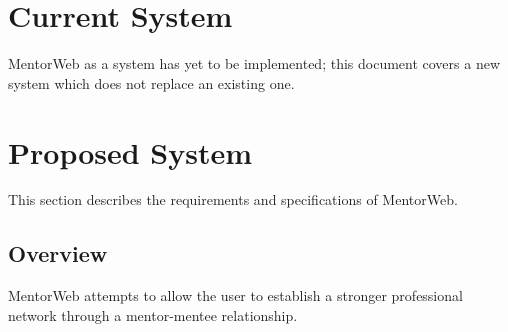 \documentclass[11pt]{article}
\begin{document}
\section{Current System}
	MentorWeb as a system has yet to be implemented; this
	document covers a new system which does not replace an existing one.

\section{Proposed System}
	This section describes the requirements and specifications of
	MentorWeb.

	\subsection{Overview}
		MentorWeb attempts to allow the user to establish a
		stronger professional network through a
		mentor-mentee relationship.
\end{document}
